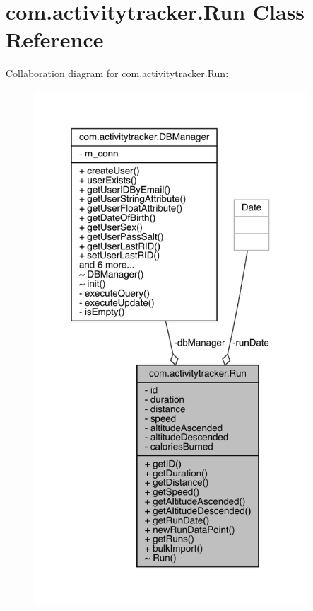 \hypertarget{classcom_1_1activitytracker_1_1_run}{}\section{com.\+activitytracker.\+Run Class Reference}
\label{classcom_1_1activitytracker_1_1_run}


Collaboration diagram for com.\+activitytracker.\+Run\+:
\nopagebreak
\begin{figure}[H]
\begin{center}
\leavevmode
\includegraphics[width=290pt]{classcom_1_1activitytracker_1_1_run__coll__graph}
\end{center}
\end{figure}
